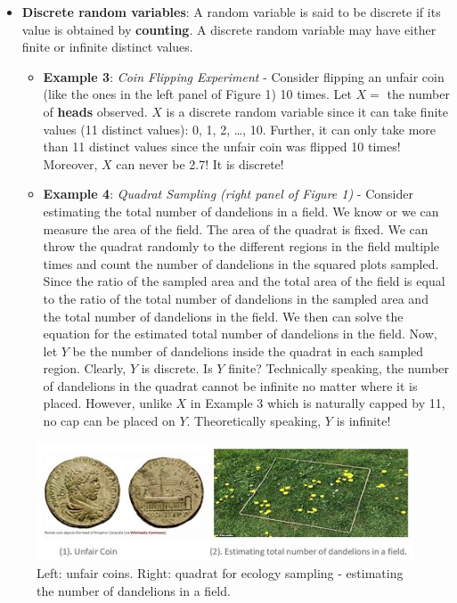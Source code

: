 \documentclass[
]{book}
\begin{document}
\begin{itemize}
\item
  \textbf{Discrete random variables}: A random variable is said to be discrete if its value is obtained by \textbf{counting}. A discrete random variable may have either finite or infinite distinct values.

  \begin{itemize}
  \item
    \textbf{Example 3}: \emph{Coin Flipping Experiment} - Consider flipping an unfair coin (like the ones in the left panel of Figure 1) 10 times. Let \(X=\) the number of \textbf{heads} observed. \(X\) is a discrete random variable since it can take finite values (11 distinct values): 0, 1, 2, \ldots, 10. Further, it can only take more than 11 distinct values since the unfair coin was flipped 10 times! Moreover, \(X\) can never be 2.7! It is discrete!
  \item
    \textbf{Example 4}: \emph{Quadrat Sampling (right panel of Figure 1)} - Consider estimating the total number of dandelions in a field. We know or we can measure the area of the field. The area of the quadrat is fixed. We can throw the quadrat randomly to the different regions in the field multiple times and count the number of dandelions in the squared plots sampled. Since the ratio of the sampled area and the total area of the field is equal to the ratio of the total number of dandelions in the sampled area and the total number of dandelions in the field. We then can solve the equation for the estimated total number of dandelions in the field. Now, let \(Y\) be the number of dandelions inside the quadrat in each sampled region. Clearly, \(Y\) is discrete. Is \(Y\) finite? Technically speaking, the number of dandelions in the quadrat cannot be infinite no matter where it is placed. However, unlike \(X\) in Example 3 which is naturally capped by 11, no cap can be placed on \(Y\). Theoretically speaking, \(Y\) is infinite!
  \end{itemize}
\end{itemize}

\begin{figure}

{\centering \includegraphics[width=0.9\linewidth]{img04/w04-UnfairCoin-DandelionsSampling} 

}

\caption{ Left: unfair coins. Right: quadrat for ecology sampling - estimating the number of dandelions in a field.}\label{fig:unnamed-chunk-57}
\end{figure}
\end{document}
